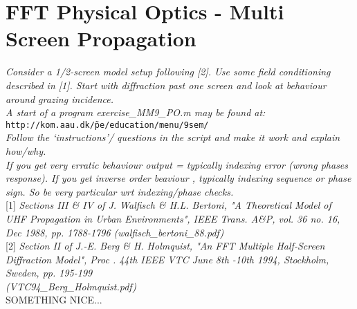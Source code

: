 \section{FFT Physical Optics - Multi Screen Propagation}
\textit{Consider a 1/2-screen model setup following [2]. Use some field conditioning described in [1]. Start with diffraction past one screen and look at behaviour around grazing incidence.}\\

\noindent \textit{A start of a program exercise\_MM9\_PO.m may be found at:}\\
\texttt{http://kom.aau.dk/\~pe/education/menu/9sem/}\\
\textit{Follow the ‘instructions'/ questions in the script and make it work and explain how/why.}\\

\noindent \textit{If you get very erratic behaviour output = typically indexing error (wrong phases response). If you get inverse order beaviour , typically indexing sequence or phase sign. So be very particular wrt indexing/phase checks.}\\

[1] \textit{Sections III \& IV of J. Walfisch \& H.L. Bertoni, "A Theoretical Model of UHF Propagation in Urban Environments", IEEE Trans. A\&P, vol. 36 no. 16, Dec 1988, pp. 1788-1796 (walfisch\_bertoni\_88.pdf)}\\

[2] \textit{Section II of J.-E. Berg \& H. Holmquist, "An FFT Multiple Half-Screen Diffraction Model", Proc . 44th IEEE VTC June 8th -10th 1994, Stockholm, Sweden, pp. 195-199 \\ (VTC94\_Berg\_Holmquist.pdf)}\\

SOMETHING NICE...